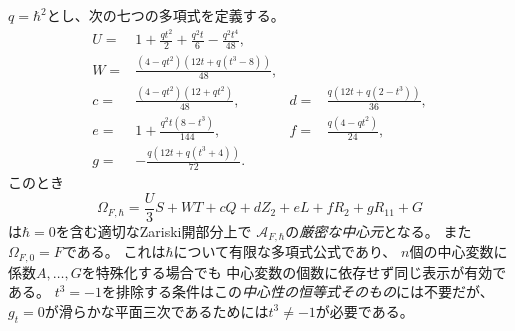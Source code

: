 \begin{theorem}[Hesse型の普遍混合中心三次式]
\label{thm:pg-universal-hesse-mixed}
$q=\hbar^2$とし、次の七つの多項式を定義する。
\begin{equation}
\begin{aligned}
 U={}&1+\frac{qt^2}{2}+\frac{q^2t}{6}-\frac{q^2t^4}{48},\\
 W={}&\frac{(4-qt^2)(12t+q(t^3-8))}{48},\\
 c={}&\frac{(4-qt^2)(12+qt^2)}{48},&
 d={}&\frac{q(12t+q(2-t^3))}{36},\\
 e={}&1+\frac{q^2t(8-t^3)}{144},&
 f={}&\frac{q(4-qt^2)}{24},\\
 g={}&-\frac{q(12t+q(t^3+4))}{72}.
\end{aligned}
\label{eq:pg-hm-coefficients}
\end{equation}
このとき
\begin{equation}
 \boxed{\quad
 \Omega_{F,\hbar}
 =\frac{U}{3}S+WT+cQ+dZ_2+eL+fR_2+gR_{11}+G
 \quad}
 \label{eq:pg-hm-center}
\end{equation}
は$\hbar=0$を含む適切なZariski開部分上で
$\mathcal A_{F,\hbar}$の\emph{厳密な中心元}となる。
また$\Omega_{F,0}=F$である。
これは$\hbar$について有限な多項式公式であり、
$n$個の中心変数に係数$A,\ldots,G$を特殊化する場合でも
中心変数の個数に依存せず同じ表示が有効である。
$t^3=-1$を排除する条件はこの\emph{中心性の恒等式そのもの}には不要だが、
$g_t=0$が滑らかな平面三次であるためには$t^3\ne-1$が必要である。
\end{theorem}
